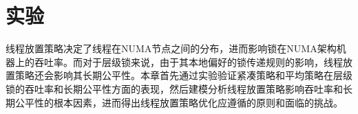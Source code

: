
\chapter{实验}
\label{chap:example}
线程放置策略决定了线程在NUMA节点之间的分布，进而影响锁在NUMA架构机器上的吞吐率。而对于层级锁来说，由于其本地偏好的锁传递规则的影响，线程放置策略还会影响其长期公平性。本章首先通过实验验证紧凑策略和平均策略在层级锁的吞吐率和长期公平性方面的表现，然后建模分析线程放置策略影响吞吐率和长期公平性的根本因素，进而得出线程放置策略优化应遵循的原则和面临的挑战。
